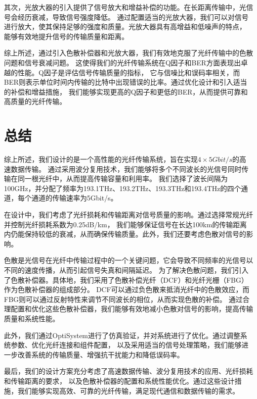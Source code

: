 \documentclass[12pt, a4paper, oneside]{article}
\begin{document}
\begin{spacing}{2.0}
其次，光放大器的引入提供了信号放大和增益补偿的功能。在长距离传输中，光信号会经历衰减，导致信号强度降低。
通过配置适当的光放大器，我们可以对信号进行放大，使其保持足够的强度和质量。光放大器具有高增益和低噪声的特点，
能够有效地提升信号的传输质量和距离。

综上所述，通过引入色散补偿器和光放大器，我们有效地克服了光纤传输中的色散问题和信号衰减问题。
这使得我们的光纤传输系统在Q因子和BER方面表现出卓越的性能。Q因子是评估信号传输质量的指标，
它与信噪比和误码率相关，而BER则表示单位时间内传输的比特中出现错误的比率。通过优化设计和引入适当的补偿和增益措施，
我们能够实现更高的Q因子和更低的BER，从而提供可靠和高质量的光纤传输。

\clearpage     %
\section{总结}
综上所述，我们设计的是一个高性能的光纤传输系统，旨在实现$4\times 5 Gbit/s$的高速数据传输。
通过采用波分复用技术，我们能够将多个不同波长的光信号同时传输在同一根光纤中，从而提高传输容量和利用率。
我们选择了波长间隔为100GHz，并分配了频率为193.1THz、193.2THz、193.3THz和193.4THz的四个通道，每个通道的传输速率为5Gbit/s。

在设计中，我们考虑了光纤损耗和传输距离对信号质量的影响。通过选择常规光纤并控制光纤损耗系数为0.25dB/km，
我们能够保证信号在长达100km的传输距离内仍能保持较低的衰减，从而确保传输质量。此外，我们还要考虑色散对信号的影响。

色散是光信号在光纤中传输过程中的一个关键问题，它会导致不同频率的光信号以不同的速度传播，从而引起信号失真和间隔延迟。
为了解决色散问题，我们引入了色散补偿器。具体地，我们采用了色散补偿光纤（DCF）和光纤光栅（FBG）作为色散补偿器的组成部分。
DCF可以通过负色散来抵消光纤中的色散效应，而FBG则可以通过反射特性来调节不同波长的相位，从而实现色散的补偿。
通过合理配置和优化这些色散补偿器，我们能够有效地减小色散对信号的影响，提高传输质量和系统性能。

此外，我们通过OptiSystem进行了仿真验证，并对系统进行了优化。通过调整系统参数、优化光纤连接和组件配置，
以及采用适当的信号处理策略，我们能够进一步改善系统的传输质量、增强抗干扰能力和降低误码率。

最后，我们的设计方案充分考虑了高速数据传输、波分复用技术的应用、光纤损耗和传输距离的要求，
以及色散补偿器的配置和系统性能优化。通过这些设计措施，我们能够实现高效、可靠的光纤传输，满足现代通信和数据传输的需求。
\clearpage







\end{spacing}{}



\end{document}
